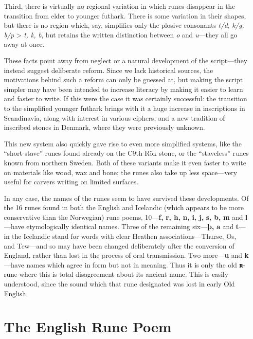 Third, there is virtually no regional variation in which runes disappear in the transition from elder to younger futhark.  There is some variation in their shapes, but there is no region which, say, simplifies only the plosive consonants \emph{t/d, k/g, b/p} > \emph{t, k, b}, but retains the written distinction between \emph{o} and \emph{u}—they all go away at once.

These facts point away from neglect or a natural development of the script—they instead suggest deliberate reform.  Since we lack historical sources, the motivations behind such a reform can only be guessed at, but making the script simpler may have been intended to increase literacy by making it easier to learn and faster to write.  If this were the case it was certainly successful: the transition to the simplified younger futhark brings with it a huge increase in inscriptions in Scandinavia, along with interest in various ciphers, and a new tradition of inscribed stones in Denmark, where they were previously unknown.

This new system also quickly gave rise to even more simplified systems, like the “short-stave” runes found already on the C9th Rök stone, or the “staveless” runes known from northern Sweden.  Both of these variants make it even faster to write on materials like wood, wax and bone; the runes also take up less space—very useful for carvers writing on limited surfaces.

In any case, the names of the runes seem to have survived these developments.  Of the 16 runes found in both the English and Icelandic (which appears to be more conservative than the Norwegian) rune poems, 10—\textbf{f, r, h, n, i, j, s, b, m} and \textbf{l}—have etymologically identical names.  Three of the remaining six—\textbf{þ, a} and \textbf{t}—in the Icelandic stand for words with clear Heathen associations—Thurse, Os, and Tew—and so may have been changed deliberately after the conversion of England, rather than lost in the process of oral transmission.  Two more—\textbf{u} and \textbf{k}—have names which agree in form but not in meaning.  Thus it is only the old \textbf{ʀ}-rune where this is total disagreement about its ancient name.  This is easily understood, since the sound which that rune designated was lost in early Old English.

\section{The English Rune Poem}\chapterStart{}

